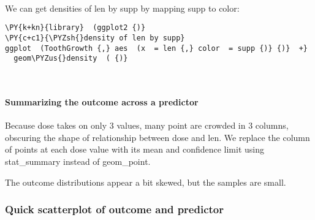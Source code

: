     
    
    \begin{center}
    \end{center}
    { \hspace*{\fill} \\}
    
    We can get densities of len by supp by mapping supp to color:

    \begin{tcolorbox}[breakable, size=fbox, boxrule=1pt, pad at break*=1mm,colback=cellbackground, colframe=cellborder]
\begin{Verbatim}[commandchars=\\\{\}]
\PY{k+kn}{library}  (ggplot2 {)}
\PY{c+c1}{\PYZsh{}density of len by supp}
ggplot  (ToothGrowth {,} aes  (x  = len {,} color  = supp {)} {)}  +} 
  geom\PYZus{}density  ( {)}
\end{Verbatim}
\end{tcolorbox}

    
    
    \begin{center}
    \end{center}
    { \hspace*{\fill} \\}
    
    \paragraph{Summarizing the outcome across a
predictor}\label{summarizing-the-outcome-across-a-predictor}

Because dose takes on only 3 values, many point are crowded in 3
columns, obscuring the shape of relationship between dose and len. We
replace the column of points at each dose value with its mean and
confidence limit using stat\_summary instead of geom\_point.

    The outcome distributions appear a bit skewed, but the samples are
small.

\subsubsection{Quick scatterplot of outcome and
predictor}\label{quick-scatterplot-of-outcome-and-predictor}

